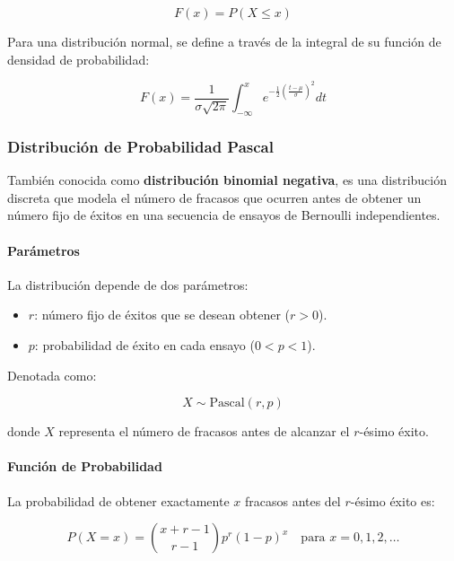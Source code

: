 \documentclass{article}
\begin{document}
\begin{equation}
    F(x) = P(X \leq x)
\end{equation}

Para una distribución normal, se define a través de la integral de su función de densidad de
probabilidad:

\begin{equation}
    F(x) = \frac{1}{\sigma\sqrt{2\pi}} \int_{-\infty}^{x} e^{-\frac{1}{2}\left(\frac{t - \mu}{\sigma}\right)^2} dt
\end{equation}


\subsubsection{Distribución de Probabilidad Pascal}

También conocida como \textbf{distribución binomial negativa}, es una distribución discreta que
modela el número de fracasos que ocurren antes de obtener un número fijo de éxitos en
una secuencia de ensayos de Bernoulli independientes.

\paragraph{Parámetros}

La distribución depende de dos parámetros:

\begin{itemize}
    \item $r$: número fijo de éxitos que se desean obtener ($r > 0$).
    \item $p$: probabilidad de éxito en cada ensayo ($0 < p < 1$).
\end{itemize}

Denotada como:

\begin{equation}
    X \sim \mathrm{Pascal}(r, p)
\end{equation}

donde $X$ representa el número de fracasos antes de alcanzar el $r$-ésimo éxito.

\paragraph{Función de Probabilidad}

La probabilidad de obtener exactamente $x$ fracasos antes del $r$-ésimo éxito es:

\begin{equation}
    P(X = x) = \binom{x + r - 1}{r - 1} p^r (1-p)^x \quad \text{para } x = 0, 1, 2, \ldots
\end{equation}
\end{document}
